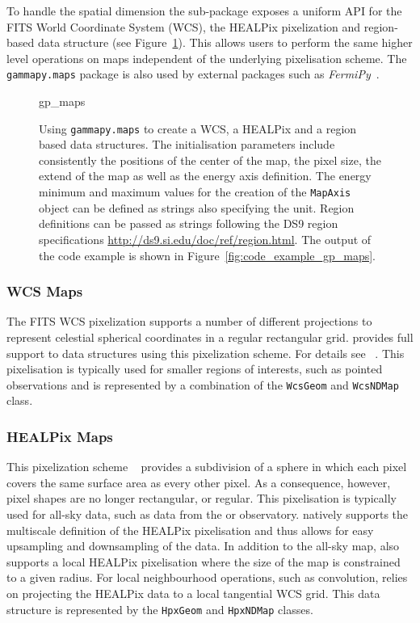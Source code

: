 \documentclass[longauth]{aa}
\newcommand{\code}[1]{\texttt{#1}}
\begin{document}
To handle the spatial dimension the sub-package exposes a uniform API for
the FITS World Coordinate System (WCS), the HEALPix pixelization and
region-based data structure (see Figure~\ref{fig*:minted:gp_maps}).
This allows users to perform the same higher level operations on maps
independent of the underlying pixelisation scheme. The \code{gammapy.maps}
package is also used by external packages such as \textit{FermiPy}~\citep{Wood2017}.

\begin{figure}
	\small
	{gp_maps}

	\caption{
        Using \code{gammapy.maps} to create a WCS, a HEALPix and a region
		based data structures. The initialisation parameters include
        consistently the positions of the center of the map, the pixel
        size, the extend of the map as well as the energy axis definition.
        The energy minimum and maximum values for the creation of the
        \code{MapAxis} object can be defined as strings also specifying the
        unit. Region definitions can be passed as strings following
        the DS9 region specifications \url{http://ds9.si.edu/doc/ref/region.html}. The output
		of the code example is shown in Figure~\ref{fig:code_example_gp_maps}.
        }
    \label{fig*:minted:gp_maps}
\end{figure}

\subsubsection{WCS Maps}
The FITS WCS pixelization supports a number of different projections to
represent celestial spherical coordinates in a regular rectangular grid.
\gammapy provides full support to data structures using this pixelization
scheme. For details see ~\cite{Calabretta2002}. This pixelisation
is typically used for smaller regions of interests, such as pointed
observations and is represented by a combination of the
\code{WcsGeom} and \code{WcsNDMap} class.


\subsubsection{HEALPix Maps}
This pixelization scheme ~\citep{Calabretta2002, Gorski2005} provides a
subdivision of a sphere in which each pixel covers the same surface area as
every other pixel. As a consequence, however, pixel shapes are no longer
rectangular, or regular.
This pixelisation is typically used for all-sky data, such as data
from the \hawc or \fermi observatory. \gammapy natively supports
the multiscale definition of the HEALPix pixelisation and thus
allows for easy upsampling and downsampling of the data. In addition to
the all-sky map, \gammapy also supports a local HEALPix
pixelisation where the size of the map is constrained to a given
radius.
For local neighbourhood operations, such as convolution, \gammapy relies
on projecting the HEALPix data to a local tangential WCS grid.
This data structure is represented by the \code{HpxGeom} and \code{HpxNDMap}
classes. 
\end{document}
